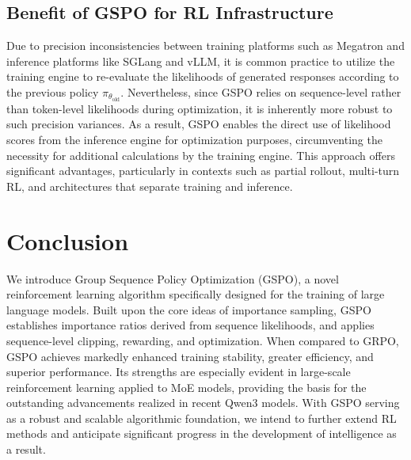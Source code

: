 \subsection{Benefit of GSPO for RL Infrastructure}

Due to precision inconsistencies between training platforms such as Megatron and inference platforms like SGLang and vLLM, it is common practice to utilize the training engine to re-evaluate the likelihoods of generated responses according to the previous policy $\pi_{\theta_\text{old}}$. Nevertheless, since GSPO relies on sequence-level rather than token-level likelihoods during optimization, it is inherently more robust to such precision variances. As a result, GSPO enables the direct use of likelihood scores from the inference engine for optimization purposes, circumventing the necessity for additional calculations by the training engine. This approach offers significant advantages, particularly in contexts such as partial rollout, multi-turn RL, and architectures that separate training and inference.

\section{Conclusion}

We introduce Group Sequence Policy Optimization (GSPO), a novel reinforcement learning algorithm specifically designed for the training of large language models. Built upon the core ideas of importance sampling, GSPO establishes importance ratios derived from sequence likelihoods, and applies sequence-level clipping, rewarding, and optimization. When compared to GRPO, GSPO achieves markedly enhanced training stability, greater efficiency, and superior performance. Its strengths are especially evident in large-scale reinforcement learning applied to MoE models, providing the basis for the outstanding advancements realized in recent Qwen3 models. With GSPO serving as a robust and scalable algorithmic foundation, we intend to further extend RL methods and anticipate significant progress in the development of intelligence as a result.

